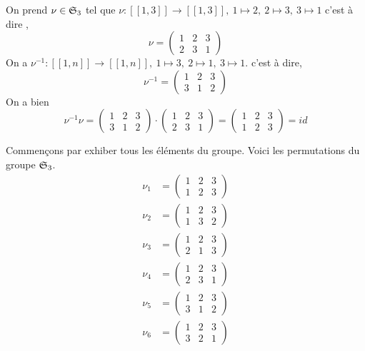 \begin{exemple}
    On prend $\nu \in \mathfrak{S}_3$ tel que $\nu: [[1,3]]\to [[1,3]], \: 1\mapsto 2, \: 2\mapsto3, \: 3\mapsto 1$ c'est à dire ,
\[
\nu = \begin{pmatrix}
    1 &2&3\\ 2 &3 & 1
\end{pmatrix}
\]
On a $\nu^{-1}: [[1,n]]\to [[1,n]], \: 1\mapsto 3, \: 2 \mapsto 1, \: 3\mapsto 1$. c'est à dire,
\[
\nu^{-1}=\begin{pmatrix}
    1&2&3\\3&1&2
\end{pmatrix}
\]
On a bien 
\[
\nu^{-1}\nu= \begin{pmatrix}
    1&2&3\\3&1&2
\end{pmatrix}\cdot\begin{pmatrix}
    1&2&3\\ 2&3&1
\end{pmatrix}=\begin{pmatrix}
    1&2&3\\1&2&3
\end{pmatrix}=id
\]
\end{exemple}
\begin{exemple}
Commençons par exhiber tous les éléments du groupe. Voici les permutations du groupe $\mathfrak{S}_3$.
\begin{align*}
    \nu_1&= \begin{pmatrix}
        1&2&3\\1&2&3
    \end{pmatrix}\\
    \nu_2&= \begin{pmatrix}
        1&2&3\\1&3&2
    \end{pmatrix}\\
    \nu_3&=\begin{pmatrix}
        1&2&3\\2&1&3
    \end{pmatrix}\\
    \nu_4&=\begin{pmatrix}
        1&2&3\\2&3&1
    \end{pmatrix}\\
    \nu_5&= \begin{pmatrix}
        1&2&3\\3&1&2
    \end{pmatrix}\\
    \nu_6&=\begin{pmatrix}
        1&2&3\\3&2&1
    \end{pmatrix}
\end{align*}
\end{exemple}

